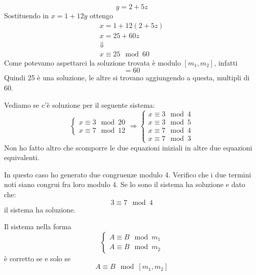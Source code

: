 \begin{example}
\begin{equation*}
		y = 2 + 5z
	\end{equation*}
	Sostituendo in $x = 1 + 12y$ ottengo
	\begin{equation*}
		\begin{array}{c}
			x = 1 + 12(2 + 5z) \\
			x = 25 + 60z       \\
			\Downarrow         \\
			x \equiv 25 \mod{60}
		\end{array}
	\end{equation*}
	Come potevamo aspettarci la soluzione trovata \`e modulo $[m_1, m_2]$, infatti
	\begin{equation*}
		[12, 20] = 60
	\end{equation*}
	Quindi 25 \`e una soluzione, le altre si trovano aggiungendo a questa, multipli di 60.
\end{example}

\begin{example}
	Vediamo se c'\`e soluzione per il seguente sistema:
	\begin{equation*}
		\begin{cases}
			x \equiv 3 \mod{20} \\
			x \equiv 7 \mod{12}
		\end{cases}
		\Rightarrow
		\begin{cases}
			x \equiv 3 \mod{4} \\
			x \equiv 3 \mod{5} \\
			x \equiv 7 \mod{4} \\
			x \equiv 7 \mod{3}
		\end{cases}
	\end{equation*}
	Non ho fatto altro che scomporre le due equazioni iniziali in altre due equazioni
	equivalenti.

	In questo caso ho generato due congruenze modulo 4. Verifico che i due termini noti siano
	congrui fra loro modulo 4. Se lo sono il sistema ha soluzione e dato che:
	\begin{equation*}
		3 \equiv 7 \mod{4}
	\end{equation*}
	il sistema ha soluzione.
\end{example}

\begin{theorem}
	Il sistema nella forma
	\begin{equation*}
		\begin{cases}
			A \equiv B \mod{m_1} \\
			A \equiv B \mod{m_2}
		\end{cases}
	\end{equation*}
	\`e corretto se e solo se
	\begin{equation*}
		A \equiv B \mod{[m_1, m_2]}
	\end{equation*}
\end{theorem}

